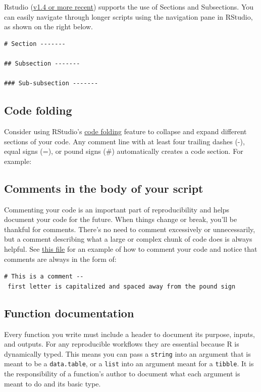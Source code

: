 \documentclass[
]{book}
\begin{document}
Rstudio (\href{https://blog.rstudio.com/2020/12/02/rstudio-v1-4-preview-little-things/}{v1.4 or more recent}) supports the use of Sections and Subsections. You can easily navigate through longer scripts using the navigation pane in RStudio, as shown on the right below.

\begin{verbatim}
# Section -------

## Subsection -------

### Sub-subsection -------
\end{verbatim}

\subsection{Code folding}\label{code-folding}

Consider using RStudio's \href{https://support.rstudio.com/hc/en-us/articles/200484568-Code-Folding-and-Sections}{code folding} feature to collapse and expand different sections of your code. Any comment line with at least four trailing dashes (-), equal signs (=), or pound signs (\#) automatically creates a code section. For example:

\subsection{Comments in the body of your script}\label{comments-in-the-body-of-your-script}

Commenting your code is an important part of reproducibility and helps document your code for the future. When things change or break, you'll be thankful for comments. There's no need to comment excessively or unnecessarily, but a comment describing what a large or complex chunk of code does is always helpful. See \href{https://github.com/kmishra9/Flu-Absenteeism/blob/master/Master's\%20Thesis\%20-\%20Spatial\%20Epidemiology\%20of\%20Influenza/1b\%20-\%20Map-Management.R}{this file} for an example of how to comment your code and notice that comments are always in the form of:

\texttt{\#\ This\ is\ a\ comment\ -\/-\ first\ letter\ is\ capitalized\ and\ spaced\ away\ from\ the\ pound\ sign}

\subsection{Function documentation}\label{function-documentation}

Every function you write must include a header to document its purpose, inputs, and outputs. For any reproducible workflows they are essential because R is dynamically typed. This means you can pass a \texttt{string} into an argument that is meant to be a \texttt{data.table}, or a \texttt{list} into an argument meant for a \texttt{tibble}. It is the responsibility of a function's author to document what each argument is meant to do and its basic type.
\end{document}
